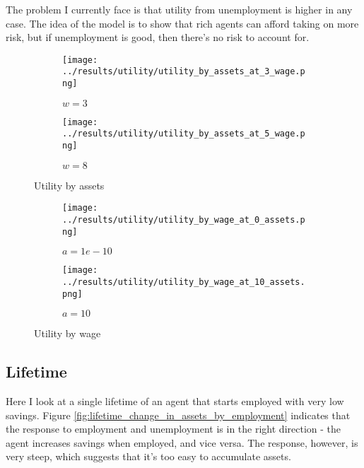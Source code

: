 \documentclass[12pt]{article}
\begin{document}
\vspace{5mm}
The problem I currently face is that utility from unemployment is higher in any case. The idea of the model is to show that rich agents can afford taking on more risk, but if unemployment is good, then there's no risk to account for.

\begin{figure}[hbt!]

\begin{subfigure}{0.5\textwidth}
\texttt{[image: ../results/utility/utility\_by\_assets\_at\_3\_wage.png]} \caption{$w=3$}
\end{subfigure}%
\begin{subfigure}{0.5\textwidth}
\texttt{[image: ../results/utility/utility\_by\_assets\_at\_5\_wage.png]}
\caption{$w=8$}
\end{subfigure}

\caption{Utility by assets}
\label{fig:utility_by_assets}
\end{figure}

\begin{figure}[hbt!]

\begin{subfigure}{0.5\textwidth}
\texttt{[image: ../results/utility/utility\_by\_wage\_at\_0\_assets.png]} \caption{$a=1e-10$}
\end{subfigure}%
\begin{subfigure}{0.5\textwidth}
\texttt{[image: ../results/utility/utility\_by\_wage\_at\_10\_assets.png]}
\caption{$a=10$}
\end{subfigure}

\caption{Utility by wage}
\label{fig:utility_by_wage}
\end{figure}


\clearpage


\subsection{Lifetime}

Here I look at a single lifetime of an agent that starts employed with very low savings. Figure \ref{fig:lifetime_change_in_assets_by_employment} indicates that the response to employment and unemployment is in the right direction - the agent increases savings when employed, and vice versa. The response, however, is very steep, which suggests that it's too easy to accumulate assets.
\end{document}
